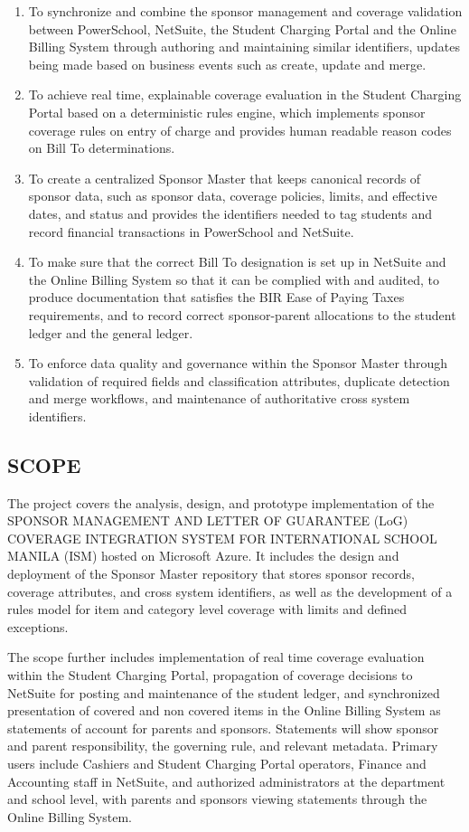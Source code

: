     \begin{enumerate}
    \item To synchronize and combine the sponsor management and coverage validation between PowerSchool, NetSuite, the Student Charging Portal and the Online Billing System through authoring and maintaining similar identifiers, updates being made based on business events such as create, update and merge.
    \item To achieve real time, explainable coverage evaluation in the Student Charging Portal based on a deterministic rules engine, which implements sponsor coverage rules on entry of charge and provides human readable reason codes on Bill To determinations.
    \item To create a centralized Sponsor Master that keeps canonical records of sponsor data, such as sponsor data, coverage policies, limits, and effective dates, and status and provides the identifiers needed to tag students and record financial transactions in PowerSchool and NetSuite.
    \item To make sure that the correct Bill To designation is set up in NetSuite and the Online 
    Billing System so that it can be complied with and audited, to produce documentation that satisfies the BIR Ease of Paying Taxes requirements, and to record correct sponsor-parent allocations to the student ledger and the general ledger.
    \item To enforce data quality and governance within the Sponsor Master through validation of required fields and classification attributes, duplicate detection and merge workflows, and maintenance of authoritative cross system identifiers.
    \end{enumerate}

\subsection{SCOPE}

    The project covers the analysis, design, and prototype implementation of the SPONSOR MANAGEMENT AND LETTER OF GUARANTEE (LoG) COVERAGE INTEGRATION SYSTEM FOR INTERNATIONAL SCHOOL MANILA (ISM) hosted on Microsoft Azure. It includes the design and deployment of the Sponsor Master repository that stores sponsor records, coverage attributes, and cross system identifiers, as well as the development of a rules model for item and category level coverage with limits and defined exceptions.
    
    The scope further includes implementation of real time coverage evaluation within the Student Charging Portal, propagation of coverage decisions to NetSuite for posting and maintenance of the student ledger, and synchronized presentation of covered and non covered items in the Online Billing System as statements of account for parents and sponsors. Statements will show sponsor and parent responsibility, the governing rule, and relevant metadata. Primary users include Cashiers and Student Charging Portal operators, Finance and Accounting staff in NetSuite, and authorized administrators at the department and school level, with parents and sponsors viewing statements through the Online Billing System.
    
